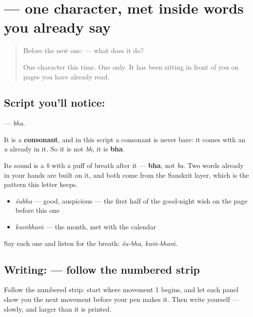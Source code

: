 \section[\texorpdfstring{\ml{ഭ} (bha)}{ഭ (bha)}]{ — one character, met inside words you already say}

\label{lesson:ML-S129-letter-bha}



\begin{quote}
Before the new one:  — what does it do?

One character this time. One only. It has been sitting in front of you on pages you have already read.
\end{quote}

\subsection*{Script you'll notice: }
\textbf{} — \emph{bha}.

It is a \textbf{consonant}, and in this script a consonant is never bare: it comes with an \emph{a} already in it. So it is not \emph{bh}, it is \textbf{bha}.

Its sound is a \emph{b} with a puff of breath after it — \textbf{bha}, not \emph{ba}. Two words already in your hands are built on it, and both come from the Sanskrit layer, which is the pattern this letter keeps.

\begin{itemize}
\raggedright
  \item \textbf{} \emph{śubha} — good, auspicious — the first half of the good-night wish on the page before this one
  \item \textbf{} \emph{kuṁbhaṁ} — the month, met with the calendar
\end{itemize}

Say each one and listen for the breath: \emph{śu-bha}, \emph{kuṁ-bhaṁ}.

\subsection*{Writing:  — follow the numbered strip}

Follow the numbered strip: start where movement 1 begins, and let each panel show you the next movement before your pen makes it. Then write  yourself — slowly, and larger than it is printed.

